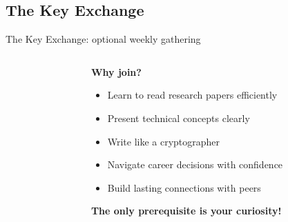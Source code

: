 \documentclass[aspectratio=169, lualatex, handout]{beamer}
\begin{document}
\subsection{The Key Exchange}

\begin{frame}{The Key Exchange: optional weekly gathering}
	\begin{columns}[c]
		\begin{column}{0.5\textwidth}
		\end{column}
		\begin{column}{0.5\textwidth}
			\textbf{Why join?}
			\begin{itemize}[<+->]
				\item Learn to read research papers efficiently
				\item Present technical concepts clearly
				\item Write like a cryptographer
				\item Navigate career decisions with confidence
				\item Build lasting connections with peers
			\end{itemize}
			\vspace{0.5cm}
			\textcolor{cipherprimary}{\textbf{The only prerequisite is your curiosity!}}
		\end{column}
	\end{columns}
\end{frame}
\end{document}

